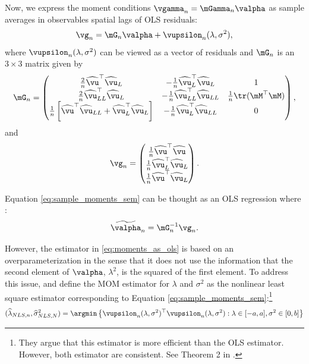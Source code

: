 \documentclass[english,12pt]{book}\usepackage[]{graphicx}\usepackage[]{xcolor}
\begin{document}
Now, we express the moment conditions $\vgamma_n = \mGamma_n\valpha$ as sample averages in observables spatial lags of OLS residuals:
\begin{equation}\label{eq:sample_moments_sem}
  \vg_n = \mG_n\valpha +  \vupsilon_n(\lambda, \sigma^2),
\end{equation}
%
where $\vupsilon_n(\lambda, \sigma^2)$ can be viewed as a vector of residuals and $\mG_n$ is an $3\times 3$ matrix given by
\begin{equation}\label{eq:matrix-G-sem}
  \mG_n = \begin{pmatrix}
   \frac{2}{n}\widehat{\vu}^\top\widehat{\vu}_L & -\frac{1}{n}\widehat{\vu}_L^\top\widehat{\vu}_L & 1\\
   \frac{2}{n}\widehat{\vu}^\top_{LL}\widehat{\vu}_L & -\frac{1}{n}\widehat{\vu}_{LL}^\top\widehat{\vu}_{LL} & \frac{1}{n} \tr(\mM^\top\mM)\\
   \frac{1}{n}\left[\widehat{\vu}^\top\widehat{\vu}_{LL} + \widehat{\vu}_L^\top\widehat{\vu}_L\right] & -\frac{1}{n}\widehat{\vu}_{L}^\top\widehat{\vu}_{LL} & 0
        \end{pmatrix},
\end{equation}
%
and
\begin{equation}\label{eq:matrix-g-sem}
  \vg_n = \begin{pmatrix}
  \frac{1}{n}\widehat{\vu}^\top\widehat{\vu} \\
  \frac{1}{n}\widehat{\vu}^\top_L\widehat{\vu}_L \\
  \frac{1}{n}\widehat{\vu}^\top\widehat{\vu}_L
        \end{pmatrix}.
\end{equation}

Equation \eqref{eq:sample_moments_sem} can be thought as an OLS regression where \citep{kelejian1998generalized}:
\begin{equation}\label{eq:moments_as_ols}
\widetilde{\valpha}_n = \mG_n^{-1}\vg_n.
\end{equation}

However, the estimator in \eqref{eq:moments_as_ols} is based on an overparameterization in the sense that it does not use the information that the second element of $\valpha$, $\lambda^2$, is the squared of the first element. To address this issue, \cite{kelejian1998generalized} and \cite{kelejian1999generalized} define the MOM estimator for $\lambda$ and $\sigma^2$ as the nonlinear least square estimator corresponding to Equation \eqref{eq:sample_moments_sem}:\footnote{They argue that this estimator is more efficient than the OLS estimator. However, both estimator are consistent. See Theorem 2 in \citep{kelejian1998generalized}.}
\begin{equation}\label{eq:nls_estimator}
  (\widehat{\lambda}_{NLS, n}, \widehat{\sigma}^2_{NLS, N}) = \argmin \left\lbrace \vupsilon_n(\lambda, \sigma^2)^\top\vupsilon_n(\lambda, \sigma^2): \lambda \in [-a, a], \sigma^2\in [0, b]\right\rbrace 
\end{equation}
\end{document}
